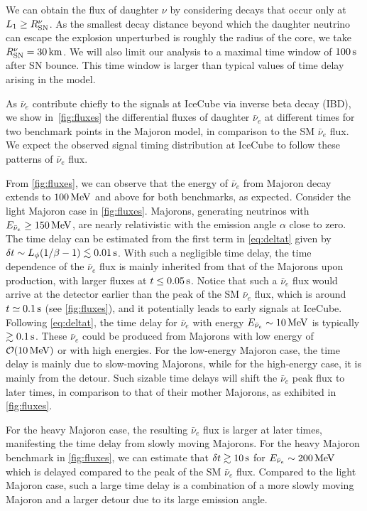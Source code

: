 \documentclass[aps,twocolumn,prl,showpacs,showkeys,preprintnumbers,superscriptaddress,nobibnotes,floatfix,longbibliography,notitlepage,nofootinbib]{revtex4-2}
\begin{document}
We can obtain the flux of daughter $\nu$ by considering decays that occur only at $L_1\geq R^{\nu}_{\rm SN}$.
As the smallest decay distance beyond which the daughter neutrino can escape the explosion unperturbed is roughly the radius of the core, we take $R^{\nu}_{\rm SN} = \unit[30]{km}$.
We will also limit our analysis to a maximal time window of $\unit[100]{s}$ after SN bounce.
This time window is larger than typical values of time delay arising in the model.


As $\bar{\nu}_e$ contribute chiefly to the signals at IceCube via inverse beta decay (IBD), we show in~\cref{fig:fluxes} the differential fluxes of daughter $\bar{\nu}_e$ at different times for two benchmark points in the Majoron model, in comparison to the SM $\bar{\nu}_e$ flux.
We expect the observed signal timing distribution at IceCube to follow these patterns of $\bar{\nu}_{e}$ flux. 

From \cref{fig:fluxes}, we can observe that the energy of $\bar{\nu}_e$ from Majoron decay extends to $\unit[100]{MeV}$ and above for both benchmarks, as expected. 
Consider the light Majoron case in \cref{fig:fluxes}.
Majorons, generating neutrinos with $E_{\bar{\nu}_e} \geq \unit[150]{MeV}$, are nearly relativistic with the emission angle $\alpha$ close to zero.
The time delay can be estimated from the first term in \cref{eq:deltat} given by $\delta t \sim L_\phi (1/\beta -1)\lesssim \unit[0.01]{s}$.
With such a negligible time delay, the time dependence of the $\bar{\nu}_e$ flux is mainly inherited from that of the Majorons upon production, with larger fluxes at $t\leq \unit[0.05]{s}$.
Notice that such a $\bar{\nu}_e$ flux would arrive at the detector earlier than the peak of the SM $\bar{\nu}_e$ flux, which is around $t\simeq \unit[0.1]{s}$ (see \cref{fig:fluxes}), and it potentially leads to early signals at IceCube.
Following \cref{eq:deltat}, the time delay for $\bar{\nu}_e$ with energy $E_{\bar{\nu}_{e}} \sim \unit[10]{MeV}$ is typically $\gtrsim \unit[0.1]{s}$.
These $\bar{\nu}_e$ could be produced from Majorons with low energy of $\mathcal{O}(\unit[10]{MeV})$ or with high energies.
For the low-energy Majoron case, the time delay is mainly due to slow-moving Majorons, while for the high-energy case, it is mainly from the detour.
Such sizable time delays will shift the $\bar{\nu}_e$ peak flux to later times, in comparison to that of their mother Majorons, as exhibited in \cref{fig:fluxes}.



For the heavy Majoron case, the resulting $\bar{\nu}_e$ flux is larger at later times, manifesting the time delay from slowly moving Majorons.
For the heavy Majoron benchmark in \cref{fig:fluxes}, we can estimate that $\delta t \gtrsim \unit[10]{s}$ for $E_{\bar{\nu}_{e}}\sim \unit[200]{MeV}$ which is delayed compared to the peak of the SM $\bar{\nu}_e$ flux.
Compared to the light Majoron case, such a large time delay is a combination of a more slowly moving Majoron and a larger detour due to its large emission angle.
\end{document}
